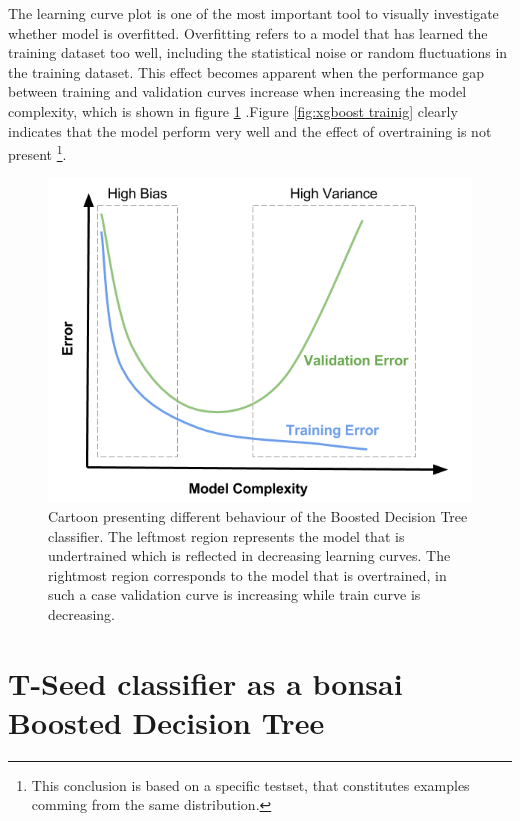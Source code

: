 The learning curve plot is one of the most important tool to visually investigate whether model is overfitted.  
Overfitting refers to a model that has learned the training dataset too well, including the statistical noise or random fluctuations in the training dataset. This effect becomes apparent when the performance gap between training and validation curves increase when increasing the model complexity, which is shown in figure \ref{fig:xgboost_overfitting} .Figure \ref{fig:xgboost trainig} clearly indicates that the model perform very well and the effect of overtraining is not present \footnote{This conclusion is based on a specific testset, that constitutes examples comming from the same distribution.}. 


\begin{figure}
\centering
\includegraphics[scale=0.6]{figures/bbdt_overfitting.png}
\caption{Cartoon presenting different behaviour of the Boosted Decision Tree classifier. The leftmost region represents the model that is undertrained which is reflected in decreasing learning curves. The rightmost region corresponds to the model that is overtrained, in such a case validation curve is increasing while train curve is decreasing. }
\label{fig:xgboost_overfitting}
\end{figure}



\section{T-Seed classifier as a bonsai Boosted Decision Tree }

